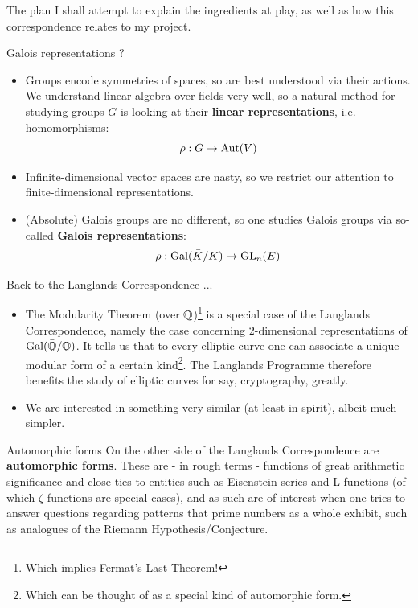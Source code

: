 \documentclass{beamer}
\begin{document}
    \begin{frame}{The plan}
        I shall attempt to explain the ingredients at play, as well as how this correspondence relates to my project.
    \end{frame}
    
    \begin{frame}{Galois representations ?}
        \begin{itemize}
            \item Groups encode symmetries of spaces, so are best understood via their actions. We understand linear algebra over fields very well, so a natural method for studying groups $G$ is looking at their \textbf{linear representations}, i.e. homomorphisms:
                $$\rho: G \to \mathrm{Aut}(V)$$
            \item Infinite-dimensional vector spaces are nasty, so we restrict our attention to finite-dimensional representations.
            \item (Absolute) Galois groups are no different, so one studies Galois groups via so-called \textbf{Galois representations}:
                $$\rho: \mathrm{Gal}(\bar{K}/K) \to \operatorname{GL}_n(E)$$
        \end{itemize}
    \end{frame}
    
    \begin{frame}{Back to the Langlands Correspondence ...}
        
        \begin{itemize}
            \item The Modularity Theorem (over $\mathbb{Q}$)\footnote{Which implies Fermat's Last Theorem!} is a special case of the Langlands Correspondence, namely the case concerning $2$-dimensional representations of $\mathrm{Gal}(\bar{\mathbb{Q}}/\mathbb{Q})$. It tells us that to every elliptic curve one can associate a unique modular form of a certain kind\footnote{Which can be thought of as a special kind of automorphic form.}. The Langlands Programme therefore benefits the study of elliptic curves for say, cryptography, greatly.
            \item We are interested in something very similar (at least in spirit), albeit much simpler.
        \end{itemize}
    \end{frame}
    
    \begin{frame}{Automorphic forms}
        On the other side of the Langlands Correspondence are \textbf{automorphic forms}. These are - in rough terms - functions of great arithmetic significance and close ties to entities such as Eisenstein series and L-functions (of which $\zeta$-functions are special cases), and as such are of interest when one tries to answer questions regarding patterns that prime numbers as a whole exhibit, such as analogues of the Riemann Hypothesis/Conjecture.
    \end{frame}
    
\end{document}
